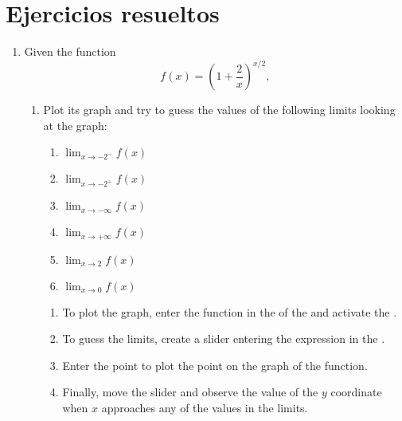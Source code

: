 \section{Ejercicios resueltos}
\begin{enumerate}[leftmargin=*]
\item Given the function
      \[
      f(x)=\left( 1+\frac{2}{x}\right) ^{x/2},
      \]

      \begin{enumerate}
      \item Plot its graph and try to guess the values of the following limits looking at the graph:
            \begin{multicols}{2}
            \begin{enumerate}
            \item $\lim_{x\rightarrow -2^-} f(x)$
            \item $\lim_{x\rightarrow -2^+} f(x)$
            \item $\lim_{x\rightarrow -\infty} f(x)$
            \item $\lim_{x\rightarrow +\infty} f(x)$
            \item $\lim_{x\rightarrow 2} f(x)$
            \item $\lim_{x\rightarrow 0} f(x)$
            \end{enumerate}
            \end{multicols}

            \begin{indication}
            \begin{enumerate}
            \item To plot the graph, enter the function  in the  of the  and activate the .
            \item To guess the limits, create a slider entering the expression  in the .
            \item Enter the point  to plot the point on the graph of the function.
            \item Finally, move the slider and observe the value of the $y$ coordinate when $x$ approaches any of the values in the limits.
            \end{enumerate}
            \end{indication}


\end{enumerate}
\end{enumerate}
